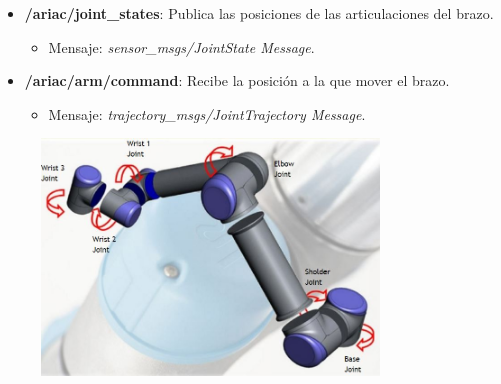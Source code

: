 \documentclass[notes,slidesec,a4]{seminar}
\begin{document}
\begin{hslide}
\begin{itemize}
	\item \textbf{/ariac/joint\_states}: Publica las posiciones de las articulaciones del brazo.
	\begin{itemize}
		\item Mensaje: \textit{sensor\_msgs/JointState Message}.
	\end{itemize}
	\item \textbf{/ariac/arm/command}: Recibe la posición a la que mover el brazo.
	\begin{itemize}
		\item Mensaje: \textit{trajectory\_msgs/JointTrajectory Message}.
	\end{itemize}
\end{itemize}
\end{hslide}

\begin{hslide}
	\begin{center}
		\begin{figure}
			\includegraphics[width=0.8\textwidth]{brazoarticulaciones.jpg}
		\end{figure}
	\end{center}
\end{hslide}
\end{document}
